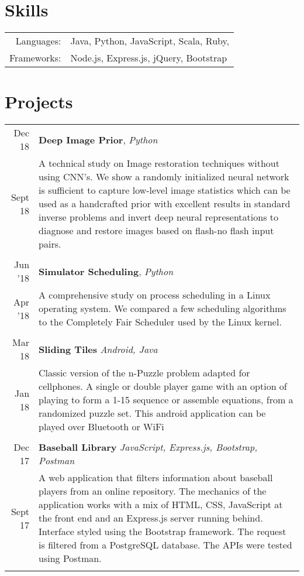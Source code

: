 \documentclass[a4paper,10pt]{article}
\begin{document}
\section{Skills}
\begin{tabular}{ rl }
	Languages:  & Java, Python, JavaScript, Scala, Ruby, \\
	Frameworks: & Node.js, Express.js, jQuery, Bootstrap \\%
\end{tabular}

\section{Projects}
\begin{tabular}{r|p{15cm}}

Dec \textquotesingle{}18 & \textbf{Deep Image Prior}, \sl{Python} \\ 
Sept \textquotesingle{}18 & \footnotesize{A technical study on Image restoration techniques without using CNN’s. We show a randomly initialized neural network is sufficient to capture low-level image statistics which can be used as a handcrafted prior with excellent results in standard inverse problems and invert deep neural representations to diagnose and restore images based on flash-no flash input pairs.}\\\multicolumn{2}{c}{}\\

Jun '18 & \textbf{Simulator Scheduling}, \sl{Python} \\
Apr '18 & \footnotesize{A comprehensive study on process scheduling in a Linux operating system. We compared a few scheduling algorithms to the Completely Fair Scheduler used by the Linux kernel.}\\\multicolumn{2}{c}{} \\

Mar \textquotesingle{}18 & {\textbf{Sliding Tiles}} {\sl Android, Java}  \\
Jan \textquotesingle{}18 & \footnotesize{Classic version of the n-Puzzle problem adapted for cellphones. A single or double player game with an option of playing to form a 1-15 sequence or assemble equations, from a randomized puzzle set. This android application can be played over Bluetooth or WiFi}\\ \multicolumn{2}{c}{} \\

Dec \textquotesingle{}17 & {\textbf{Baseball Library}} {\sl JavaScript, Express.js, Bootstrap, Postman}\\
Sept \textquotesingle{}17 & \footnotesize{A web application that filters information about baseball players from an online repository. The mechanics of the application works with a mix of HTML, CSS, JavaScript at the front end and an Express.js server running behind. Interface styled using the Bootstrap framework. The request is filtered from a PostgreSQL database. The API\textquotesingle{}s were tested using Postman.}\\ \multicolumn{2}{c}{}\\


\end{tabular}
\end{document}
